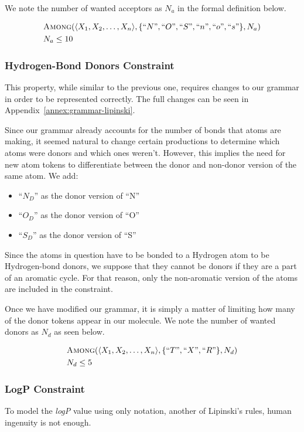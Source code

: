 \documentclass[../Document.tex]{subfiles}
\begin{document}
We note the number of wanted acceptors as $N_a$ in the formal definition below.

\begin{align*}
    &\mbox{\sc Among}(\langle X_1, X_2, \ldots, X_n \rangle, \{``N",``O",``S",``n",``o",``s"\}, N_a)\\
    &N_a \leq 10
\end{align*}


\subsubsection{Hydrogen-Bond Donors Constraint}
This property, while similar to the previous one, requires changes to our grammar in order to be represented correctly. The full changes can be seen in Appendix~\ref{annex:grammar-lipinski}.

Since our grammar already accounts for the number of bonds that atoms are making, it seemed natural to change certain productions to determine which atoms were donors and which ones weren't. However, this implies the need for new atom tokens to differentiate between the donor and non-donor version of the same atom. We add:
\begin{itemize}
    \item ``$N_D$'' as the donor version of ``N''
    \item ``$O_D$'' as the donor version of ``O''
    \item ``$S_D$'' as the donor version of ``S''
\end{itemize}

Since the atoms in question have to be bonded to a Hydrogen atom to be Hydrogen-bond donors, we suppose that they cannot be donors if they are a part of an aromatic cycle. For that reason, only the non-aromatic version of the atoms are included in the constraint.

Once we have modified our grammar, it is simply a matter of limiting how many of the donor tokens appear in our molecule. We note the number of wanted donors as $N_d$ as seen below.

\begin{align*}
    &\mbox{\sc Among}(\langle X_1, X_2, \ldots, X_n \rangle, \{``T",``X",``R"\}, N_d)\\
    &N_d \leq 5
\end{align*}


\subsubsection{LogP Constraint}
To model the \emph{logP} value using only \smiles notation, another of Lipinski's rules, human ingenuity is not enough.
\end{document}
